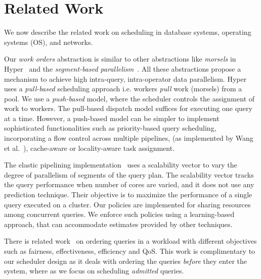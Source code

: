 \section{Related Work}\label{sec:related}
We now describe the related work on scheduling in database systems, operating systems (OS), and networks. %

Our \textit{work orders} abstraction is similar to other abstractions like \textit{morsels} in Hyper~\cite{morsel} and the \textit{segment-based parallelism}~\cite{wang2016elastic}. 
All these abstractions propose a mechanism to achieve high intra-query, intra-operator data parallelism.
Hyper~\cite{morsel} uses a \textit{pull-based} scheduling approach i.e. workers \textit{pull} work (morsels) from a pool. 
We use a \textit{push-based} model, where the scheduler controls the assignment of work to workers.
The pull-based dispatch model suffices for executing one query at a time. 
However, a push-based model can be simpler to implement sophisticated functionalities such as priority-based query scheduling, incorporating a flow control across multiple pipelines, (as implemented by Wang et al.~\cite{wang2016elastic}), cache-aware or locality-aware task assignment.

The elastic pipelining implementation~\cite{wang2016elastic} uses a scalability vector to vary the degree of parallelism of segments of the query plan.
The scalability vector tracks the query performance when number of cores are varied,  and it does not use any prediction technique.
Their objective is to maximize the performance of a single query executed on a cluster.
Our policies are implemented for sharing resources among concurrent queries.
We enforce such policies using a learning-based approach, that can accommodate estimates provided by other techniques.

There is related work~\cite{gupta2009fair} on ordering queries in a workload with different objectives such as fairness, effectiveness, efficiency and QoS. 
This work is complimentary to our scheduler design as it deals with ordering the queries \textit{before} they enter the system, where as we focus on scheduling \textit{admitted} queries. 

